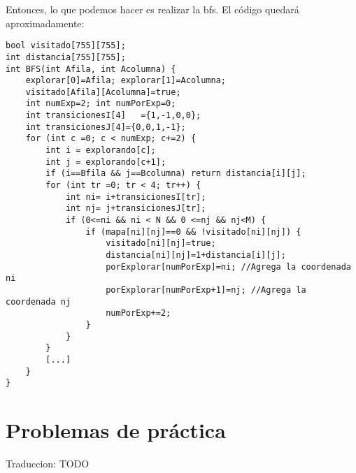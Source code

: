 Entonces, lo que podemos hacer es realizar la bfs. El código quedará aproximadamente:

\begin{minipage}{\linewidth}
\begin{lstlisting}
bool visitado[755][755];
int distancia[755][755];
int BFS(int Afila, int Acolumna) {
	explorar[0]=Afila; explorar[1]=Acolumna;
	visitado[Afila][Acolumna]=true;
	int numExp=2; int numPorExp=0;
	int transicionesI[4]   ={1,-1,0,0};
	int transicionesJ[4]={0,0,1,-1};
	for (int c =0; c < numExp; c+=2) {
		int i = explorando[c];
		int j = explorando[c+1];
		if (i==Bfila && j==Bcolumna) return distancia[i][j];
		for (int tr =0; tr < 4; tr++) {
			int ni= i+transicionesI[tr];
			int nj= j+transicionesJ[tr];
			if (0<=ni && ni < N && 0 <=nj && nj<M) {
				if (mapa[ni][nj]==0 && !visitado[ni][nj]) {
					visitado[ni][nj]=true;
					distancia[ni][nj]=1+distancia[i][j];
					porExplorar[numPorExp]=ni; //Agrega la coordenada ni
					porExplorar[numPorExp+1]=nj; //Agrega la coordenada nj
					numPorExp+=2;
				}
			}
		}
		[...]
	}
}
\end{lstlisting}
\end{minipage}

\section*{Problemas de práctica}

\begin{exercise}
	Traduccion: TODO
\end{exercise}

\begin{exercise}
\end{exercise}

\begin{exercise}
\end{exercise} 

\begin{exercise}
\end{exercise}

\begin{exercise}
\end{exercise}

